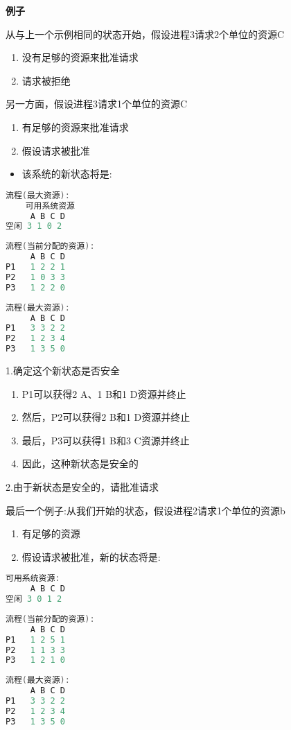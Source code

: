 \textbf{例子}

从与上一个示例相同的状态开始，假设进程3请求2个单位的资源C
\begin{enumerate}
\item 没有足够的资源来批准请求
\item 请求被拒绝
\end{enumerate}

另一方面，假设进程3请求1个单位的资源C

\begin{enumerate}
\item 有足够的资源来批准请求
\item 假设请求被批准
\end{enumerate}
\begin{itemize}
\item 该系统的新状态将是:
\end{itemize}
\begin{lstlisting}[language=cpp]
流程(最大资源):
    可用系统资源
     A B C D
空闲 3 1 0 2
\end{lstlisting}
\begin{lstlisting}[language=cpp]
    流程(当前分配的资源):
     A B C D
P1   1 2 2 1
P2   1 0 3 3
P3   1 2 2 0
\end{lstlisting}
\begin{lstlisting}[language=cpp]
    流程(最大资源):
     A B C D
P1   3 3 2 2
P2   1 2 3 4
P3   1 3 5 0
\end{lstlisting}

1.确定这个新状态是否安全
\begin{enumerate}
\item P1可以获得2 A、1 B和1 D资源并终止
\item 然后，P2可以获得2 B和1 D资源并终止
\item 最后，P3可以获得1 B和3 C资源并终止
\item 因此，这种新状态是安全的
\end{enumerate}

2.由于新状态是安全的，请批准请求

最后一个例子:从我们开始的状态，假设进程2请求1个单位的资源b
\begin{enumerate}
\item 有足够的资源
\item 假设请求被批准，新的状态将是:
\end{enumerate}
\begin{lstlisting}[language=cpp]
    可用系统资源:
     A B C D
空闲 3 0 1 2
\end{lstlisting}
\begin{lstlisting}[language=cpp]
    流程(当前分配的资源):
     A B C D
P1   1 2 5 1
P2   1 1 3 3
P3   1 2 1 0
\end{lstlisting}
\begin{lstlisting}[language=cpp]
    流程(最大资源):
     A B C D
P1   3 3 2 2
P2   1 2 3 4
P3   1 3 5 0
\end{lstlisting}

